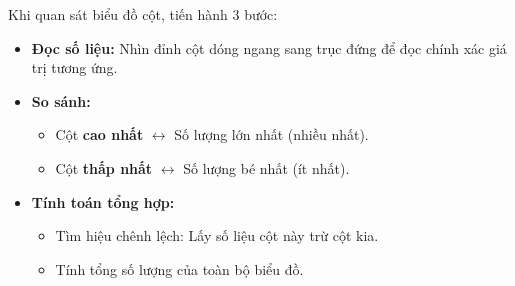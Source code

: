 \documentclass[14pt,a4paper,oneside]{extbook}
\begin{document}
\begin{minipage}[t]{0.49\textwidth}\vspace{0pt}
\begin{tcolorbox}[
  enhanced,
  colback=teal!4!white,
  colframe=teal!75!black,
  arc=2mm, boxrule=0.8pt,
  left=2mm, right=2mm, top=1.8mm, bottom=1.8mm,
  title={\footnotesize\bfseries\color{white}\faSearchPlus\ 2. Kĩ thuật đọc và phân tích số liệu}
]
{\footnotesize
Khi quan sát biểu đồ cột, tiến hành 3 bước:
\begin{itemize}\setlength{\itemsep}{1pt}\setlength{\leftskip}{-2.5mm}
  \item \textbf{Đọc số liệu:} Nhìn đỉnh cột dóng ngang sang trục đứng để đọc chính xác giá trị tương ứng.
  \item \textbf{So sánh:} 
  \begin{itemize}\setlength{\itemsep}{0.5pt}\setlength{\leftskip}{-2.5mm}
    \item Cột \textbf{cao nhất} $\leftrightarrow$ Số lượng lớn nhất (nhiều nhất).
    \item Cột \textbf{thấp nhất} $\leftrightarrow$ Số lượng bé nhất (ít nhất).
  \end{itemize}
  \item \textbf{Tính toán tổng hợp:}
  \begin{itemize}\setlength{\itemsep}{0.5pt}\setlength{\leftskip}{-2.5mm}
    \item Tìm hiệu chênh lệch: Lấy số liệu cột này trừ cột kia.
    \item Tính tổng số lượng của toàn bộ biểu đồ.
  \end{itemize}
\end{itemize}
}
\end{tcolorbox}
\end{minipage}
\end{document}
